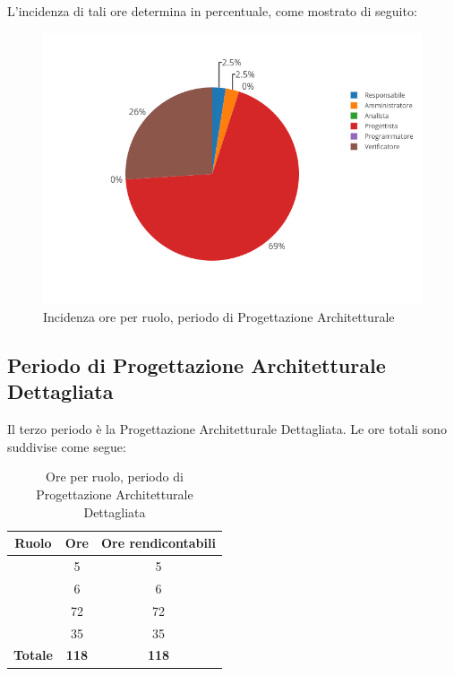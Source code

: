 L'incidenza di tali ore determina in percentuale, come mostrato di seguito:
\begin{figure}[H]
	\centering
	\includegraphics[scale=0.6]{img/ProgettazioneArchitetturale.png}
	\caption{Incidenza ore per ruolo, periodo di Progettazione Architetturale}
\end{figure}

\newpage
\subsection{Periodo di Progettazione Architetturale Dettagliata}
Il terzo periodo è la Progettazione Architetturale Dettagliata. Le ore totali sono suddivise come segue:

\begin{table}[H]
	\begin{center}
		\begin{tabular}{|c|c|c|}
			\hline
			\textbf{Ruolo}	& \textbf{Ore}	& \textbf{Ore rendicontabili} \\
			\hline
			\Res	&	5	&	5 \\
			\hline
			\Amm	&	6	&	6	\\
			\hline
			\Prog   &	72   &	72	\\
			\hline
			\Ver	&	35	&	35	\\
			\hline
			\textbf{Totale} & \textbf{118} & \textbf{118} \\
			\hline
		\end{tabular}
	\end{center}
	\caption{Ore per ruolo, periodo di Progettazione Architetturale Dettagliata}
\end{table}

